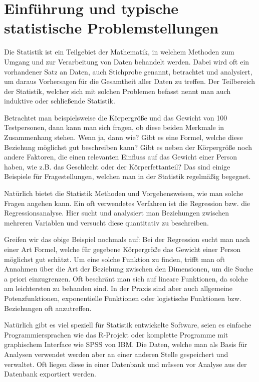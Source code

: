 \chapter{Einführung und typische statistische Problemstellungen}
\label{chapter:1}

Die Statistik ist ein Teilgebiet der Mathematik, in welchem Methoden zum Umgang und zur Verarbeitung von Daten behandelt werden. Dabei wird oft ein vorhandener Satz an Daten, auch Stichprobe genannt, betrachtet und analysiert, um daraus Vorhersagen für die Gesamtheit aller Daten zu treffen. Der Teilbereich der Statistik, welcher sich mit solchen Problemen befasst nennt man auch induktive oder schließende Statistik.

Betrachtet man beispielsweise die Körpergröße und das Gewicht von 100 Testpersonen, dann kann man sich fragen, ob diese beiden Merkmale in Zusammenhang stehen. Wenn ja, dann wie? Gibt es eine Formel, welche diese Beziehung möglichst gut beschreiben kann? Gibt es neben der Körpergröße noch andere Faktoren, die einen relevanten Einfluss auf das Gewicht einer Person haben, wie z.B. das Geschlecht oder der Körperfettanteil? Das sind einige Beispiele für Fragestellungen, welchen man in der Statistik regelmäßig begegnet.

Natürlich bietet die Statistik Methoden und Vorgehensweisen, wie man solche Fragen angehen kann. Ein oft verwendetes Verfahren ist die Regression bzw. die Regressionsanalyse. Hier sucht und analysiert man Beziehungen zwischen mehreren Variablen und versucht diese quantitativ zu beschreiben.

Greifen wir das obige Beispiel nochmals auf: Bei der Regression sucht man nach einer Art Formel, welche für gegebene Körpergröße das Gewicht einer Person möglichst gut schätzt. Um eine solche Funktion zu finden, trifft man oft Annahmen über die Art der Beziehung zwischen den Dimensionen, um die Suche a priori einzugrenzen. Oft beschränt man sich auf lineare Funktionen, da solche am leichtersten zu behanden sind. In der Praxis sind aber auch allgemeine Potenzfunktionen, exponentielle Funktionen oder logistische Funktionen bzw. Beziehungen oft anzutreffen.

Natürlich gibt es viel speziell für Statistik entwickelte Software, seien es einfache Programmiersprachen wie das R-Projekt oder komplette Programme mit graphischem Interface wie SPSS von IBM. Die Daten, welche man als Basis für Analysen verwendet werden aber an einer anderen Stelle gespeichert und verwaltet. Oft liegen diese in einer Datenbank und müssen vor Analyse aus der Datenbank exportiert werden.


